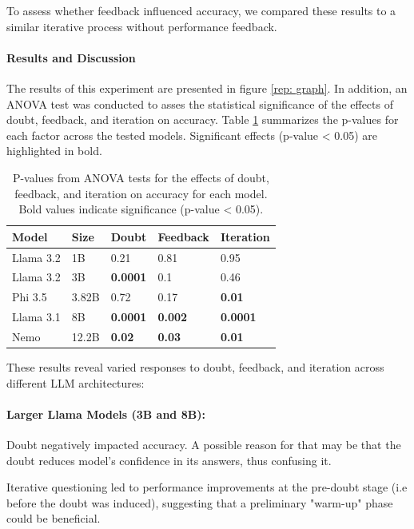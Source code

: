 To assess whether feedback influenced accuracy, we compared these results to a similar iterative process without performance feedback.

\paragraph{Results and Discussion}
The results of this experiment are presented in figure \ref{rep: graph}. In addition, an ANOVA test was conducted to asses the statistical significance of the effects of doubt, feedback, and iteration on accuracy. Table \ref{rep: p-value} summarizes the p-values for each factor across the tested models. Significant effects (p-value < 0.05) are highlighted in bold.

\begin{table}[ht]
  \centering
  \small
  \begin{tabular}{|l|l|l|l|l|}
    \hline
    \textbf{Model} & \textbf{Size} & \textbf{Doubt} & \textbf{Feedback} & \textbf{Iteration} \\
    \hline
    Llama 3.2 & 1B & 0.21 & 0.81 & 0.95 \\
    Llama 3.2 & 3B & \textbf{0.0001} & 0.1 & 0.46 \\
    Phi 3.5 & 3.82B & 0.72 & 0.17 & \textbf{0.01}\\
    Llama 3.1 & 8B & \textbf{0.0001} & \textbf{0.002} & \textbf{0.0001} \\
    Nemo & 12.2B & \textbf{0.02} & \textbf{0.03} & \textbf{0.01}\\
    \hline
  \end{tabular}
  \caption{P-values from ANOVA tests for the effects of doubt, feedback, and iteration on accuracy for each model. Bold values indicate significance (p-value < 0.05).}
  \label{rep: p-value}
\end{table}

These results reveal varied responses to doubt, feedback, and iteration across different LLM architectures:

\paragraph{Larger Llama Models (3B and 8B):}
Doubt negatively impacted accuracy. A possible reason for that may be that the doubt reduces model's confidence in its answers, thus confusing it.

Iterative questioning led to performance improvements at the pre-doubt stage (i.e before the doubt was induced), suggesting that a preliminary "warm-up" phase could be beneficial.


